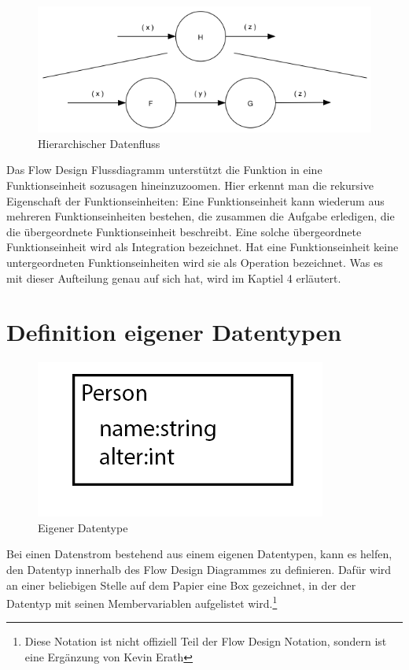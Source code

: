 \begin{figure}[!htbp]
	\centering
	\includegraphics[width=1\linewidth]{./img/diagramHir.png}
	\caption{Hierarchischer Datenfluss}
\end{figure}


Das Flow Design Flussdiagramm unterstützt die Funktion in eine Funktionseinheit sozusagen hineinzuzoomen.
Hier erkennt man die rekursive Eigenschaft der Funktionseinheiten:
Eine Funktionseinheit kann wiederum aus mehreren Funktionseinheiten bestehen,
die zusammen die Aufgabe erledigen, die die übergeordnete Funktionseinheit
beschreibt. Eine solche übergeordnete Funktionseinheit wird als Integration
bezeichnet. Hat eine Funktionseinheit keine untergeordneten Funktionseinheiten wird sie
als Operation bezeichnet. Was es mit dieser Aufteilung genau auf sich hat, wird im
Kaptiel 4 erläutert.


\section{Definition eigener Datentypen}






\begin{figure}[!htbp]
	\centering
	\includegraphics[width=.35\linewidth]{./img/diagramCustomTypes.png}
	\caption{Eigener Datentype}
\end{figure}


Bei einen Datenstrom bestehend aus einem eigenen Datentypen, kann es helfen, den Datentyp innerhalb des Flow Design Diagrammes zu definieren.
Dafür wird an einer beliebigen Stelle auf dem Papier eine Box gezeichnet,
in der der Datentyp mit seinen Membervariablen aufgelistet wird.\footnote{Diese Notation ist nicht offiziell Teil der Flow Design Notation,
sondern ist eine Ergänzung von Kevin Erath}

